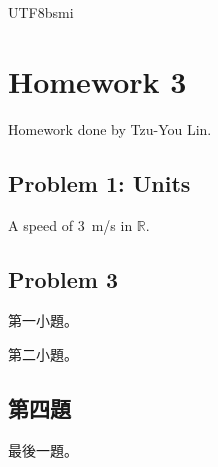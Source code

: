 \documentclass[12pt,letterpaper,oneside,openany,extrafontsizes]{memoir}
\def \authorname    {Tzu-You Lin}
\newcommand{\R}{\mathbb{R}}
\begin{document}
\begin{CJK*}{UTF8}{bsmi}
\setcounter{chapter}{2}
\chapter{Homework 3}

Homework done by \authorname.

\section*{Problem 1: Units}
A speed of \SI{3}{m/s} in $\R$.
\newpage

\section*{Problem 3}
\begin{li}[label=(\alph*)]
  \item 第一小題。
  \item 第二小題。
\end{li}

\section*{第四題}
最後一題。

\end{CJK*}
\end{document}
